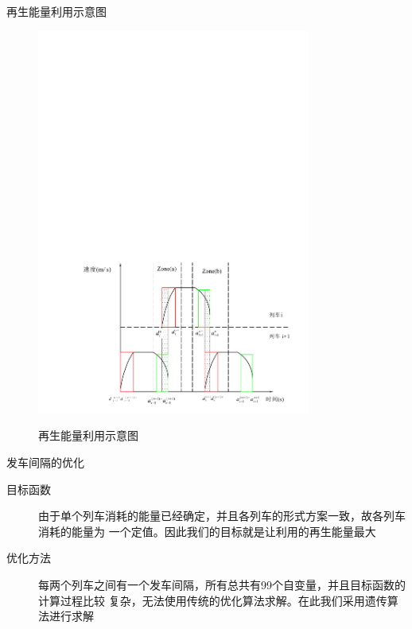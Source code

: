 \documentclass{beamer}
\begin{document}
\begin{frame}{再生能量利用示意图}
\begin{figure}
  \centering
  \includegraphics[trim=3cm 0.4cm 1cm 17.2cm, width=9cm]{fig/fig12/fig12.pdf}\\
  \caption{再生能量利用示意图}
\end{figure}

\end{frame}

\begin{frame}{发车间隔的优化}

\begin{description}
    \item[目标函数] 由于单个列车消耗的能量已经确定，并且各列车的形式方案一致，故各列车消耗的能量为
    一个定值。因此我们的目标就是让利用的再生能量最大
    \item[优化方法] 每两个列车之间有一个发车间隔，所有总共有99个自变量，并且目标函数的计算过程比较
    复杂，无法使用传统的优化算法求解。在此我们采用遗传算法进行求解
\end{description}

\end{frame}
\end{document}
